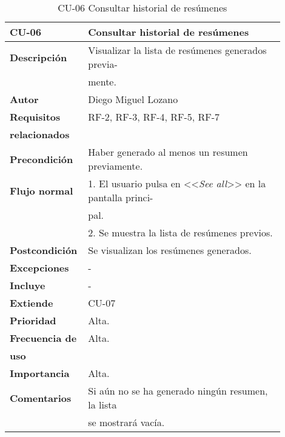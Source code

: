 \begin{longtable}{>{\raggedright}b{0.2\linewidth}>{\raggedright\arraybackslash}b{0.7\linewidth}}
	\toprule
	\textbf{CU-06} & \textbf{Consultar historial de resúmenes} \\
	\toprule
	\endhead
	
	\toprule
	\caption{CU-06 Consultar historial de resúmenes}
	\endfoot
	
	\small{\textbf{Descripción}} & Visualizar la lista de resúmenes generados previa- \\
	& mente. \\
	\small{\textbf{Autor}} & Diego Miguel Lozano \\
	\small{\textbf{Requisitos}} & RF-2, RF-3, RF-4, RF-5, RF-7  \\
	\small{\textbf{relacionados}} & \\
	\small{\textbf{Precondición}} & Haber generado al menos un resumen previamente. \\
	\small{\textbf{Flujo normal}} & \quad \small{1. El usuario pulsa en <<\emph{See all}>> en la pantalla princi-} \\
	& \qquad \small{pal.} \\
	& \quad \small{2. Se muestra la lista de resúmenes previos.} \\
	\small{\textbf{Postcondición}} & Se visualizan los resúmenes generados. \\
	\small{\textbf{Excepciones}} & - \\
	\small{\textbf{Incluye}} & - \\
	\small{\textbf{Extiende}} & CU-07 \\
	\small{\textbf{Prioridad}} & Alta. \\
	\small{\textbf{Frecuencia de}} & Alta. \\
	\small{\textbf{uso}} & \\
	\small{\textbf{Importancia}} & Alta. \\
	\small{\textbf{Comentarios}} & Si aún no se ha generado ningún resumen, la lista\\
	& se mostrará vacía. \\
\end{longtable}


